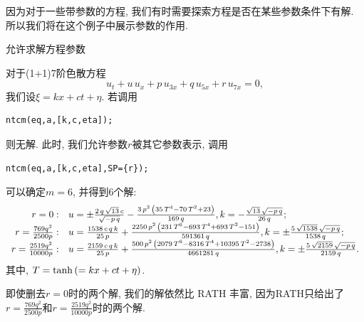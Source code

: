 因为对于一些带参数的方程, 我们有时需要探索方程是否在某些参数条件下有解. 所以我们将在这个例子中展示参数的作用.

\begin{example}允许求解方程参数

对于(1+1)7阶色散方程\cite{duffy1996travelling}
\begin{equation}
    {{u}_{t}}+u\,{{u}_{x}}+p\,{{u}_{3x}}+q\,{{u}_{5x}}+r\,{{u}_{7x}}=0,
\end{equation}
我们设$\xi=kx+ct+\eta$. 若调用
\begin{verbatim}
ntcm(eq,a,[k,c,eta]);
\end{verbatim}
则无解. 此时, 我们允许参数$r$被其它参数表示, 调用
\begin{verbatim}
ntcm(eq,a,[k,c,eta],SP={r});
\end{verbatim}
可以确定$m=6$, 并得到6个解:
\begin{equation}
\def\arraystretch{1.2}
\begin{array}{rl}
r=0:& u=\pm \frac{2\,q\,\sqrt {13}\,c}{\sqrt {-p\,q}}-\frac{3\,{p}^{2}\,\left( 35\,{T}^{4}-70\,{T}^{2}+23\right) }{169\,q},k=-\frac{\sqrt {13}\,\sqrt {-p\,q}}{26\,q};\\
r=\frac{769 q^2}{2500 p}:& u=\frac{1538\,c\,q\,k}{25\,p}+\frac{2250\,{p}^{2}\,\left( 231\,{T}^{6}-693\,{T}^{4}+693\,{T}^{2}-151\right) }{591361\,q},k=\pm \frac{5\,\sqrt {1538}\,\sqrt {-p\,q}}{1538\,q};\\
r=\frac{2519 q^2}{10000 p}:& u=\frac{2159\,c\,q\,k}{25\,p}+\frac{500\,{p}^{2}\,\left( 2079\,{T}^{6}-8316\,{T}^{4}+10395\,{T}^{2}-2738\right) }{4661281\,q},k=\pm\frac{5\,\sqrt {2159}\,\sqrt {-p\,q}}{2159\,q}.\\
\end{array}
\end{equation}
其中, $T=\tanh\left(=kx+ct+\eta\right)$. 

即使删去$r=0$时的两个解, 我们的解依然比 RATH\cite[p21]{liu2001master} 丰富, 因为RATH只给出了$r=\frac{769 q^2}{2500 p}$和$r=\frac{2519 q^2}{10000 p}$时的两个解.
\end{example}

